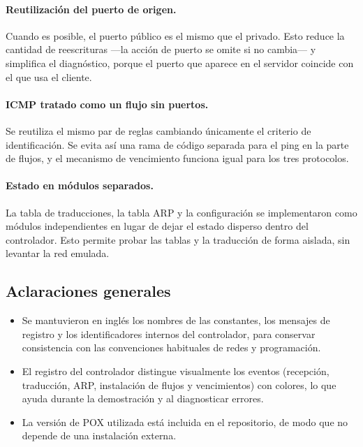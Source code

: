 ﻿\documentclass[10pt,a4paper]{article}
\begin{document}
\paragraph{Reutilización del puerto de origen.} Cuando es posible, el puerto público
es el mismo que el privado. Esto reduce la cantidad de reescrituras ---la acción de
puerto se omite si no cambia--- y simplifica el diagnóstico, porque el puerto que
aparece en el servidor coincide con el que usa el cliente.

\paragraph{ICMP tratado como un flujo sin puertos.} Se reutiliza el mismo par de
reglas cambiando únicamente el criterio de identificación. Se evita así una rama de
código separada para el ping en la parte de flujos, y el mecanismo de vencimiento
funciona igual para los tres protocolos.

\paragraph{Estado en módulos separados.} La tabla de traducciones, la tabla ARP y la
configuración se implementaron como módulos independientes en lugar de dejar el
estado disperso dentro del controlador. Esto permite probar las tablas y la
traducción de forma aislada, sin levantar la red emulada.

\subsection{Aclaraciones generales}

\begin{itemize}[nosep]
    \item Se mantuvieron en inglés los nombres de las constantes, los mensajes de
          registro y los identificadores internos del controlador, para conservar
          consistencia con las convenciones habituales de redes y programación.
    \item El registro del controlador distingue visualmente los eventos
          (recepción, traducción, ARP, instalación de flujos y vencimientos) con
          colores, lo que ayuda durante la demostración y al diagnosticar errores.
    \item La versión de POX utilizada está incluida en el repositorio, de modo que no
          depende de una instalación externa.
\end{itemize}
\end{document}
